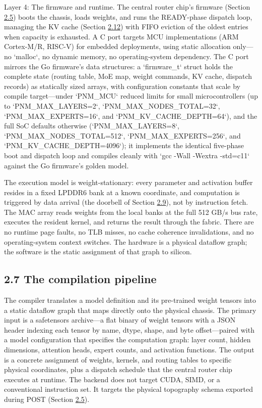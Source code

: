 \documentclass[12pt,onecolumn]{article}
\begin{document}
Layer 4: The firmware and runtime. The central router chip's firmware (Section \hyperref[sec:2.5]{2.5}) boots the chassis, loads weights, and runs the READY-phase dispatch loop, managing the KV cache (Section \hyperref[sec:2.12]{2.12}) with FIFO eviction of the oldest entries when capacity is exhausted. A C port targets MCU implementations (ARM Cortex-M/R, RISC-V) for embedded deployments, using static allocation only---no `malloc`, no dynamic memory, no operating-system dependency. The C port mirrors the Go firmware's data structures: a `firmware\_t` struct holds the complete state (routing table, MoE map, weight commands, KV cache, dispatch records) as statically sized arrays, with configuration constants that scale by compile target---under `PNM\_MCU` reduced limits for small microcontrollers (up to `PNM\_MAX\_LAYERS=2`, `PNM\_MAX\_NODES\_TOTAL=32`, `PNM\_MAX\_EXPERTS=16`, and `PNM\_KV\_CACHE\_DEPTH=64`), and the full SoC defaults otherwise (`PNM\_MAX\_LAYERS=8`, `PNM\_MAX\_NODES\_TOTAL=512`, `PNM\_MAX\_EXPERTS=256`, and `PNM\_KV\_CACHE\_DEPTH=4096`); it implements the identical five-phase boot and dispatch loop and compiles cleanly with `gcc -Wall -Wextra -std=c11` against the Go firmware's golden model.

The execution model is weight-stationary: every parameter and activation buffer resides in a fixed LPDDR6 bank at a known coordinate, and computation is triggered by data arrival (the doorbell of Section \hyperref[sec:2.9]{2.9}), not by instruction fetch. The MAC array reads weights from the local banks at the full 512 GB/s bus rate, executes the resident kernel, and returns the result through the fabric. There are no runtime page faults, no TLB misses, no cache coherence invalidations, and no operating-system context switches. The hardware is a physical dataflow graph; the software is the static assignment of that graph to silicon.

\subsection*{2.7 The compilation pipeline}\label{sec:2.7}

The compiler translates a model definition and its pre-trained weight tensors into a static dataflow graph that maps directly onto the physical chassis. The primary input is a safetensors archive---a flat binary of weight tensors with a JSON header indexing each tensor by name, dtype, shape, and byte offset---paired with a model configuration that specifies the computation graph: layer count, hidden dimensions, attention heads, expert counts, and activation functions. The output is a concrete assignment of weights, kernels, and routing tables to specific physical coordinates, plus a dispatch schedule that the central router chip executes at runtime. The backend does not target CUDA, SIMD, or a conventional instruction set. It targets the physical topography schema exported during POST (Section \hyperref[sec:2.5]{2.5}).
\end{document}
